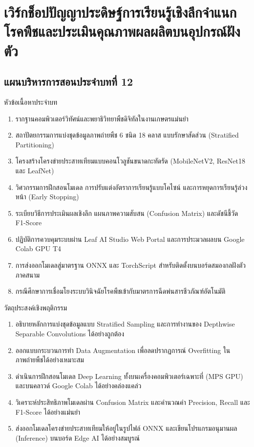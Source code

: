 \chapter{เวิร์กช็อปปัญญาประดิษฐ์การเรียนรู้เชิงลึกจำแนกโรคพืชและประเมินคุณภาพผลผลิตบนอุปกรณ์ฝังตัว}
\label{chap:ch12}

\section*{แผนบริหารการสอนประจำบทที่ 12}

\begin{planbox}{หัวข้อเนื้อหาประจำบท}
\begin{enumerate}[topsep=2pt, itemsep=1pt, partopsep=0pt, parsep=0pt, leftmargin=1.5em]
    \item รากฐานคอมพิวเตอร์วิทัศน์และพยาธิวิทยาพืชดิจิทัลในงานเกษตรแม่นยำ
    \item สถาปัตยกรรมการแบ่งชุดข้อมูลภาพถ่ายพืช 6 ชนิด 18 คลาส แบบรักษาสัดส่วน (Stratified Partitioning)
    \item โครงสร้างโครงข่ายประสาทเทียมแบบคอนโวลูชันขนาดกะทัดรัด (MobileNetV2, ResNet18 และ LeafNet)
    \item วิศวกรรมการฝึกสอนโมเดล การปรับแต่งอัตราการเรียนรู้แบบโคไซน์ และการหยุดการเรียนรู้ล่วงหน้า (Early Stopping)
    \item ระเบียบวิธีการประเมินผลเชิงลึก แผนภาพความสับสน (Confusion Matrix) และดัชนีชี้วัด F1-Score
    \item ปฏิบัติการควบคุมระบบผ่าน Leaf AI Studio Web Portal และการประมวลผลบน Google Colab GPU T4
    \item การส่งออกโมเดลสู่มาตรฐาน ONNX และ TorchScript สำหรับติดตั้งบนบอร์ดสมองกลฝังตัวภาคสนาม
    \item กรณีศึกษาการเชื่อมโยงระบบวินิจฉัยโรคพืชเข้ากับมาตรการฉีดพ่นสารชีวภัณฑ์อัตโนมัติ
\end{enumerate}
\end{planbox}

\begin{planbox}{วัตถุประสงค์เชิงพฤติกรรม}
\begin{enumerate}[topsep=2pt, itemsep=1pt, partopsep=0pt, parsep=0pt, leftmargin=1.5em]
    \item อธิบายหลักการแบ่งชุดข้อมูลแบบ Stratified Sampling และการทำงานของ Depthwise Separable Convolutions ได้อย่างถูกต้อง
    \item ออกแบบกระบวนการทำ Data Augmentation เพื่อลดปรากฏการณ์ Overfitting ในภาพถ่ายพืชได้อย่างเหมาะสม
    \item ดำเนินการฝึกสอนโมเดล Deep Learning ทั้งบนเครื่องคอมพิวเตอร์เฉพาะที่ (MPS GPU) และบนคลาวด์ Google Colab ได้อย่างคล่องแคล่ว
    \item วิเคราะห์ประสิทธิภาพโมเดลผ่าน Confusion Matrix และคำนวณค่า Precision, Recall และ F1-Score ได้อย่างแม่นยำ
    \item ส่งออกโมเดลโครงข่ายประสาทเทียมให้อยู่ในรูปไฟล์ ONNX และเขียนโปรแกรมอนุมานผล (Inference) บนบอร์ด Edge AI ได้อย่างสมบูรณ์
\end{enumerate}
\end{planbox}

